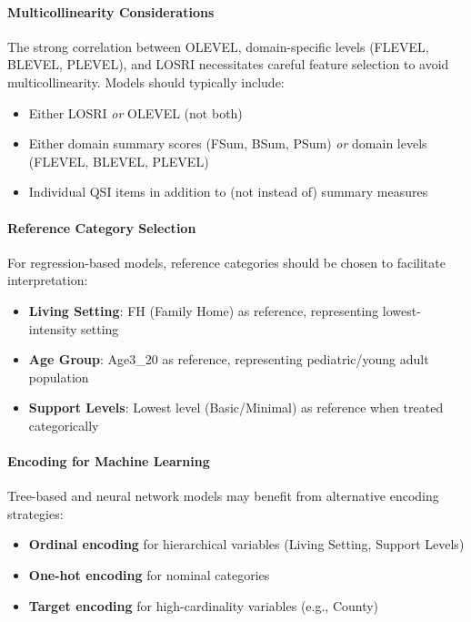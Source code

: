 \paragraph{Multicollinearity Considerations}
The strong correlation between OLEVEL, domain-specific levels (FLEVEL, BLEVEL, PLEVEL), and LOSRI necessitates careful feature selection to avoid multicollinearity. Models should typically include:
\begin{itemize}
    \item Either LOSRI \textit{or} OLEVEL (not both)
    \item Either domain summary scores (FSum, BSum, PSum) \textit{or} domain levels (FLEVEL, BLEVEL, PLEVEL)
    \item Individual QSI items in addition to (not instead of) summary measures
\end{itemize}

\paragraph{Reference Category Selection}
For regression-based models, reference categories should be chosen to facilitate interpretation:
\begin{itemize}
    \item \textbf{Living Setting}: FH (Family Home) as reference, representing lowest-intensity setting
    \item \textbf{Age Group}: Age3\_20 as reference, representing pediatric/young adult population
    \item \textbf{Support Levels}: Lowest level (Basic/Minimal) as reference when treated categorically
\end{itemize}

\paragraph{Encoding for Machine Learning}
Tree-based and neural network models may benefit from alternative encoding strategies:
\begin{itemize}
    \item \textbf{Ordinal encoding} for hierarchical variables (Living Setting, Support Levels)
    \item \textbf{One-hot encoding} for nominal categories
    \item \textbf{Target encoding} for high-cardinality variables (e.g., County)
\end{itemize}

